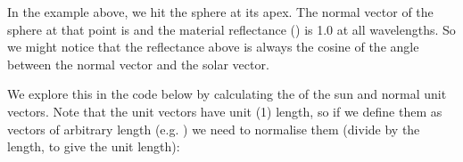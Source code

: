 \documentclass[letterpaper,10pt,english]{sphinxmanual}
\begin{document}
In the example above, we hit the sphere at its apex. The normal vector of the sphere at that point is  and the material reflectance () is 1.0 at all wavelengths. So we might notice that the  reflectance above is always the cosine of the angle between the normal vector  and the solar vector.

We explore this in the code below by calculating the  of the sun and normal unit vectors. Note that the unit vectors have unit (1) length, so if we define them as vectors of arbitrary length (e.g. ) we need to normalise them (divide by the length, to give the unit length):

{
\begin{sphinxVerbatim}[commandchars=\\\{\}]
\llap{\color{nbsphinxin}[18]:\,\hspace{\fboxrule}\hspace{\fboxsep}}   
     


  \PYG{p}{[}\PYG{p}{]}
  
  

  \PYG{p}{[}\PYG{p}{]}
  
  

  
\end{sphinxVerbatim}
}
\end{document}
